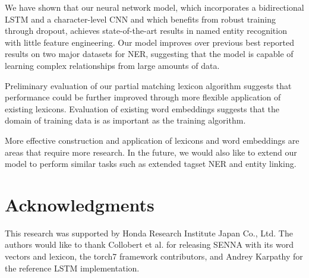 \documentclass[11pt,letterpaper]{article}
\begin{document}
We have shown that our neural network model, which incorporates a bidirectional LSTM and a character-level CNN and which benefits from robust training through dropout, achieves state-of-the-art results in named entity recognition with little feature engineering. Our model improves over previous best reported results on two major datasets for NER, suggesting that the model is capable of learning complex relationships from large amounts of data.

Preliminary evaluation of our partial matching lexicon algorithm suggests that performance could be further improved through more flexible application of existing lexicons. Evaluation of existing word embeddings suggests that the domain of training data is as important as the training algorithm. 

More effective construction and application of lexicons and word embeddings are areas that require more research. In the future, we would also like to extend our model to perform similar tasks such as extended tagset NER and entity linking.



\section*{Acknowledgments}

This research was supported by Honda Research Institute Japan Co., Ltd. The authors would like to thank Collobert et al.  for releasing SENNA with its word vectors and lexicon, the torch7 framework contributors, and Andrey Karpathy for the reference LSTM implementation.





\end{document}
